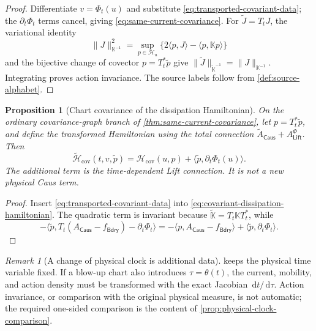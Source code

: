 \documentclass[11pt]{article}
\numberwithin{section}{part}
\theoremstyle{plain}
\newtheorem{proposition}[proposition]{Proposition}
\theoremstyle{definition}
\theoremstyle{remark}
\newtheorem{remark}[remark]{Remark}
\newcommand{\dd}{\,\mathrm d}
\newcommand{\Caus}{\mathsf{Caus}}
\newcommand{\Lift}{\mathsf{Lift}}
\newcommand{\Bdry}{\mathsf{Bdry}}
\newcommand{\Hspace}{\mathcal H}
\begin{document}
\begin{proof}
Differentiate \(v=\Phi_t(u)\) and substitute
\eqref{eq:transported-covariant-data}; the \(\partial_t\Phi_t\) terms cancel,
giving \eqref{eq:same-current-covariance}.  For \(\widetilde J=T_tJ\), the
variational identity
\[
 \|J\|_{\mathbb K^{-1}}^2
 =\sup_{p\in\Hspace_u}
   \{2\langle p,J\rangle-\langle p,\mathbb Kp\rangle\}
\]
and the bijective change of covector
\(p=T_t^*\widetilde p\) give
\(\|\widetilde J\|_{\widetilde{\mathbb K}^{-1}}
  =\|J\|_{\mathbb K^{-1}}\).
Integrating proves action invariance.  The source labels follow from
\cref{def:source-alphabet}.
\end{proof}

\begin{proposition}[Chart covariance of the dissipation Hamiltonian]
\label{prop:covariant-hamiltonian-chart}
On the ordinary covariance-graph branch of
\cref{thm:same-current-covariance}, let
\(p=T_t^*\widetilde p\), and define the transformed Hamiltonian using the
total connection \(\widetilde A_{\Caus}+A_{\Lift}^{\Phi}\).  Then
\begin{equation}
 \label{eq:hamiltonian-chart-shift}
 \widetilde{\mathscr H}_{\mathrm{cov}}(t,v,\widetilde p)
 =\mathscr H_{\mathrm{cov}}(u,p)
  +\langle\widetilde p,\partial_t\Phi_t(u)\rangle.
\end{equation}
The additional term is the time-dependent Lift connection.  It is not a new
physical Caus term.
\end{proposition}

\begin{proof}
Insert \eqref{eq:transported-covariant-data} into
\eqref{eq:covariant-dissipation-hamiltonian}.  The quadratic term is invariant
because \(\widetilde{\mathbb K}=T_t\mathbb KT_t^*\), while
\[
-\langle\widetilde p,
 T_t(A_{\Caus}-f_{\Bdry})-\partial_t\Phi_t\rangle
 =-\langle p,A_{\Caus}-f_{\Bdry}\rangle
 +\langle\widetilde p,\partial_t\Phi_t\rangle.
\]
\end{proof}

\begin{remark}[A change of physical clock is additional data]
\label{rem:chart-clock-separation}
 keeps the physical time variable fixed.
If a blow-up chart also introduces \(\tau=\theta(t)\), the current,
mobility, and action density must be transformed with the exact Jacobian
\(\dd t/\dd\tau\).  Action invariance, or comparison with the original
physical measure, is not automatic; the required one-sided comparison is
the content of \cref{prop:physical-clock-comparison}.
\end{remark}
\end{document}
